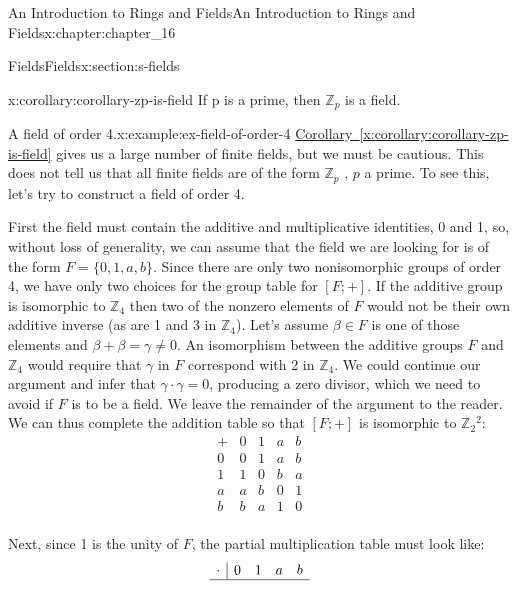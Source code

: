 \documentclass[oneside,10pt,]{book}
\newcommand{\xreffont}{\relax}
\numberwithin{equation}{section}
\begin{document}
\begin{chapterptx}{An Introduction to Rings and Fields}{}{An Introduction to Rings and Fields}{}{}{x:chapter:chapter_16}
\begin{sectionptx}{Fields}{}{Fields}{}{}{x:section:s-fields}
\begin{corollary}{}{}{x:corollary:corollary-zp-is-field}%
If p is a prime, then \(\mathbb{Z}_p\) is a field.%
\end{corollary}
\begin{example}{A field of order 4.}{x:example:ex-field-of-order-4}%
\hyperref[x:corollary:corollary-zp-is-field]{Corollary~{\xreffont\ref{x:corollary:corollary-zp-is-field}}} gives us a large number of finite fields, but we must be cautious. This  does not tell us that all finite fields are of the form \(\mathbb{Z}_p\) , \(p\) a prime. To see this, let's try to construct a field of order 4.%
\par
First the field must contain the additive and multiplicative identities, 0 and 1, so, without loss of generality, we can assume that the field we are looking for is of the form \(F = \{0, 1, a, b\}\).  Since there are only two nonisomorphic groups of order 4, we have only two choices for the group table for \([F; +]\).   If the additive group is isomorphic to \(\mathbb{Z}_4\) then two of the nonzero elements of \(F\) would not be their own additive inverse (as are 1 and 3 in \(\mathbb{Z}_4\)).   Let's assume \(\beta \in F\) is one of those elements and \(\beta +\beta =\gamma \neq 0\).  An isomorphism between the additive groups \(F\) and  \(\mathbb{Z}_4\) would require that \(\gamma\) in \(F\)  correspond with 2 in  \(\mathbb{Z}_4\).  We could continue our argument and infer that \(\gamma \cdot \gamma =0\), producing a zero divisor, which we need to avoid if \(F\) is to be a field.   We leave the remainder of the argument to the reader.   We can thus complete the addition table so that \([F;+]\) is isomorphic to \(\mathbb{Z}_2{}^2\):%
\begin{equation*}
\begin{array}{c|cccc}
+ & 0 & 1 & a & b \\
\hline
0 & 0 & 1 & a & b \\
1 & 1 & 0 & b & a \\
a & a & b & 0 & 1 \\
b & b & a & 1 & 0 \\
\end{array}
\end{equation*}
%
\par
Next, since 1 is the unity of \(F\), the partial multiplication table must look like:%
\begin{equation*}
\begin{array}{c|cccc}
\cdot & 0 & 1 & a & b \\
\hline

\end{array}
\end{equation*}
\end{example}
\end{sectionptx}
\end{chapterptx}
\end{document}
